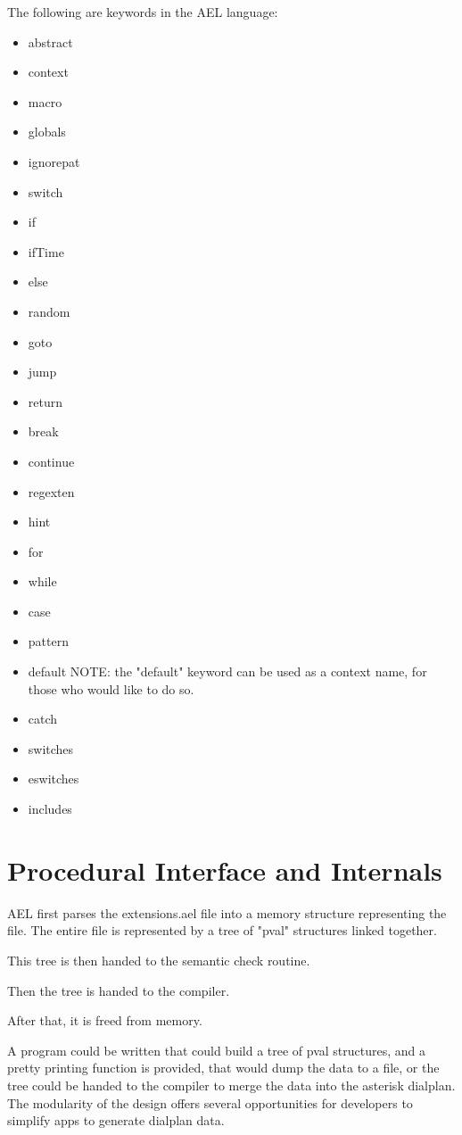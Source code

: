 {The following are keywords in the AEL language:
\begin{itemize}
    \item abstract
    \item context
    \item macro
    \item globals
    \item ignorepat
    \item switch
    \item if
    \item ifTime
    \item else
    \item random
    \item goto
    \item jump
    \item return
    \item break
    \item continue
    \item regexten
    \item hint
    \item for
    \item while
    \item case
    \item pattern
    \item default   NOTE: the "default" keyword can be used as a context name, 
                      for those who would like to do so.
    \item catch
    \item switches
    \item eswitches
    \item includes 
\end{itemize}


\section{Procedural Interface and Internals}

AEL first parses the extensions.ael file into a memory structure representing the file.
The entire file is represented by a tree of "pval" structures linked together.

This tree is then handed to the semantic check routine. 

Then the tree is handed to the compiler. 

After that, it is freed from memory.

A program could be written that could build a tree of pval structures, and
a pretty printing function is provided, that would dump the data to a file,
or the tree could be handed to the compiler to merge the data into the 
asterisk dialplan. The modularity of the design offers several opportunities
for developers to simplify apps to generate dialplan data.


}
